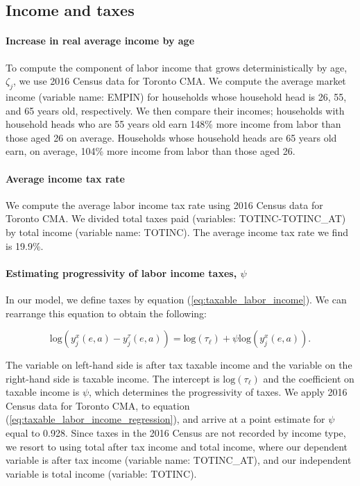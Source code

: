 \documentclass[parskip=full]{article}
\begin{document}
\subsection{Income and taxes}

\paragraph{Increase in real average income by age}

To compute the component of labor income that grows deterministically by age, $\zeta_{j}$, we use 2016 Census data for Toronto CMA. We compute the average market income (variable name: EMPIN) for households whose household head is 26, 55, and 65 years old, respectively. We then compare their incomes; households with household heads who are 55 years old earn 148\% more income from labor than those aged 26 on average. Households whose household heads are 65 years old earn, on average, 104\% more income from labor than those aged 26. 

\paragraph{Average income tax rate}

We compute the average labor income tax rate using 2016 Census data for Toronto CMA. We divided total taxes paid (variables: TOTINC-TOTINC\_AT) by total income (variable name: TOTINC). The average income tax rate we find is 19.9\%.

\paragraph{Estimating progressivity of labor income taxes, $\psi$}

In our model, we define taxes by equation (\ref{eq:taxable_labor_income}). We can rearrange this equation to obtain the following:

\begin{equation}\label{eq:taxable_labor_income_regression}
  \mbox{log}(y^{x}_{j}(e,a)-y^{\tau}_{j}(e,a))=\mbox{log}(\tau_{\ell})+\psi \mbox{log}(y^{x}_{j}(e,a)).
\end{equation}

\noindent The variable on left-hand side is after tax taxable income and the variable on the right-hand side is taxable income. The intercept is $\mbox{log}(\tau_{\ell})$ and the coefficient on taxable income is $\psi$, which determines the progressivity of taxes. We apply 2016 Census data for Toronto CMA, to equation (\ref{eq:taxable_labor_income_regression}), and arrive at a point estimate for $\psi$ equal to 0.928. Since taxes in the 2016 Census are not recorded by income type, we resort to using total after tax income and total income, where our dependent variable is after tax income (variable name: TOTINC\_AT), and our independent variable is total income (variable: TOTINC).
\end{document}
